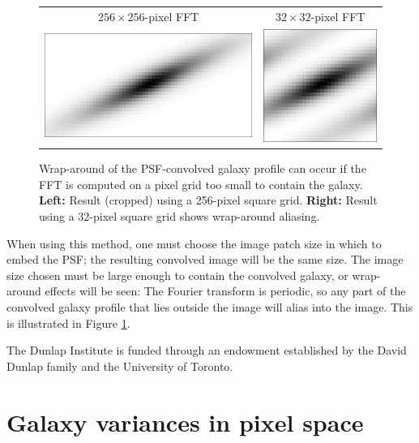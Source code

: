 \documentclass[11pt,preprint]{aastex}
\newcommand{\trick}{method}
\begin{document}
\begin{figure}
\begin{center}
\begin{tabular}{@{}cc@{}}
  $256 \times 256$-pixel FFT &
  $32 \times 32$-pixel FFT \\
  \includegraphics[height=0.22\textwidth]{gal-00} &
  \includegraphics[height=0.22\textwidth]{gal-01} \\
\end{tabular}
\end{center}
\caption{\label{fig:wrap}%
  Wrap-around of the PSF-convolved galaxy profile can occur if the FFT is
  computed on a pixel grid too small to contain the galaxy.
  \textbf{Left:} Result (cropped) using a 256-pixel square grid.
  \textbf{Right:} Result using a 32-pixel square grid shows wrap-around
  aliasing.
}
\end{figure}

When using this \trick, one must choose the image patch size in which
to embed the PSF; the resulting convolved image will be the same size.
The image size chosen must be large enough to contain the convolved
galaxy, or wrap-around effects will be seen: The Fourier transform is
periodic, so any part of the convolved galaxy profile that lies
outside the image will alias into the image.  This is
illustrated in Figure \ref{fig:wrap}.



\acknowledgements

The Dunlap Institute is funded through an endowment established by the David Dunlap family and the University of Toronto.


\appendix

\section{Galaxy variances in pixel space}
\label{app:transform}
\end{document}
